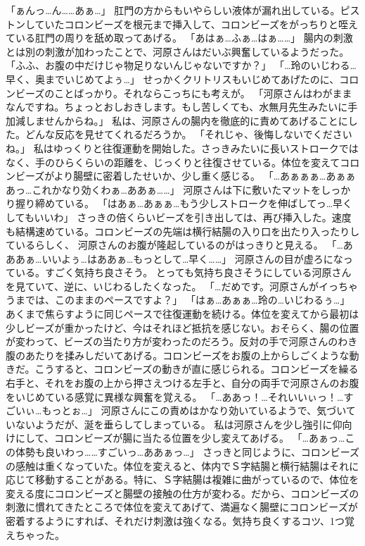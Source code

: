 「ぁんっ…ん……あぁ…」
肛門の方からもいやらしい液体が漏れ出している。ピストンしていたコロンビーズを根元まで挿入して、コロンビーズをがっちりと咥えている肛門の周りを舐め取ってあげる。
「あはぁ…ふぁ…はぁ……」
腸内の刺激とは別の刺激が加わったことで、河原さんはだいぶ興奮しているようだった。
「ふふ、お腹の中だけじゃ物足りないんじゃないですか？」
「…玲のいじわる…早く、奥までいじめてよぅ…」
せっかくクリトリスもいじめてあげたのに、コロンビーズのことばっかり。それならこっちにも考えが。
「河原さんはわがままなんですね。ちょっとおしおきします。もし苦しくても、水無月先生みたいに手加減しませんからね。」
私は、河原さんの腸内を徹底的に責めてあげることにした。どんな反応を見せてくれるだろうか。
「それじゃ、後悔しないでくださいね。」
私はゆっくりと往復運動を開始した。さっきみたいに長いストロークではなく、手のひらくらいの距離を、じっくりと往復させている。体位を変えてコロンビーズがより腸壁に密着したせいか、少し重く感じる。
「…あぁぁぁ…あぁぁあっ…これかなり効くわぁ…ああぁ……」
河原さんは下に敷いたマットをしっかり握り締めている。
「はあぁ…あぁぁ…もう少しストロークを伸ばしてっ…早くしてもいいわ」
さっきの倍くらいビーズを引き出しては、再び挿入した。速度も結構速めている。コロンビーズの先端は横行結腸の入り口を出たり入ったりしているらしく、
河原さんのお腹が隆起しているのがはっきりと見える。
「…あああぁ…いいよぅ…はああぁ…もっとして…早く……」
河原さんの目が虚ろになっている。すごく気持ち良さそう。
とっても気持ち良さそうにしている河原さんを見ていて、逆に、いじわるしたくなった。
「…だめです。河原さんがイっちゃうまでは、このままのペースですよ？」
「はぁ…あぁぁ…玲の…いじわるぅ…」
あくまで焦らすように同じペースで往復運動を続ける。体位を変えてから最初は少しビーズが重かったけど、今はそれほど抵抗を感じない。おそらく、腸の位置が変わって、ビーズの当たり方が変わったのだろう。反対の手で河原さんのわき腹のあたりを揉みしだいてあげる。コロンビーズをお腹の上からしごくような動きだ。こうすると、コロンビーズの動きが直に感じられる。コロンビーズを繰る右手と、それをお腹の上から押さえつける左手と、自分の両手で河原さんのお腹をいじめている感覚に異様な興奮を覚える。
「…ああっ！…それいいぃっ！…すごいぃ…もっとぉ…」
河原さんにこの責めはかなり効いているようで、気づいていないようだが、涎を垂らしてしまっている。
私は河原さんを少し強引に仰向けにして、コロンビーズが腸に当たる位置を少し変えてあげる。
「…あぁっ…この体勢も良いわっ……すごいっ…ああぁっ…」
さっきと同じように、コロンビーズの感触は重くなっていた。体位を変えると、体内でＳ字結腸と横行結腸はそれに応じて移動することがある。特に、Ｓ字結腸は複雑に曲がっているので、体位を変える度にコロンビーズと腸壁の接触の仕方が変わる。だから、コロンビーズの刺激に慣れてきたところで体位を変えてあげて、満遍なく腸壁にコロンビーズが密着するようにすれば、それだけ刺激は強くなる。気持ち良くするコツ、1つ覚えちゃった。
